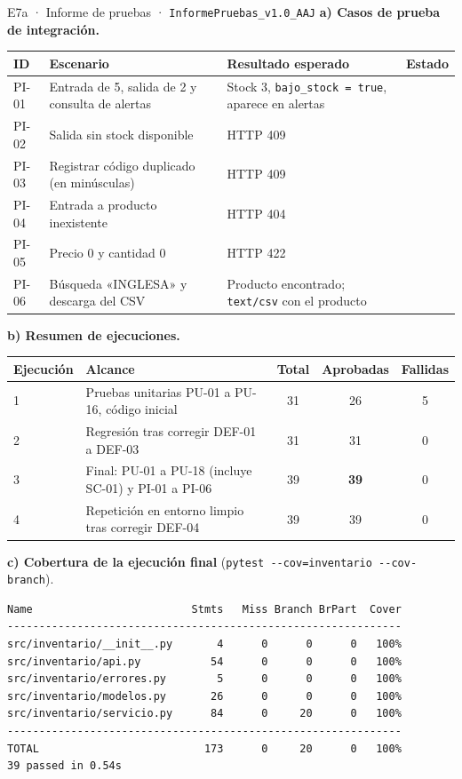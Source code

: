 \documentclass[11pt,a4paper]{article}
\newcommand{\si}{\textcolor{verdeespe}{\ding{51}}}
\newcommand{\cod}[1]{\texttt{\small #1}}
\begin{document}
\begin{evidencia}{E7a · Informe de pruebas · \cod{InformePruebas\_v1.0\_AAJ}}
\small
\textbf{a) Casos de prueba de integración.}

\begin{tabularx}{\linewidth}{@{}l L l c@{}}
\toprule
\textbf{ID} & \textbf{Escenario} & \textbf{Resultado esperado} & \textbf{Estado} \\
\midrule
PI-01 & Entrada de 5, salida de 2 y consulta de alertas & Stock 3, \cod{bajo\_stock = true}, aparece en alertas & \si \\
PI-02 & Salida sin stock disponible & HTTP 409 & \si \\
PI-03 & Registrar código duplicado (en minúsculas) & HTTP 409 & \si \\
PI-04 & Entrada a producto inexistente & HTTP 404 & \si \\
PI-05 & Precio 0 y cantidad 0 & HTTP 422 & \si \\
PI-06 & Búsqueda «INGLESA» y descarga del CSV & Producto encontrado; \cod{text/csv} con el producto & \si \\
\bottomrule
\end{tabularx}

\vspace{0.3cm}
\textbf{b) Resumen de ejecuciones.}

\begin{tabularx}{\linewidth}{@{}l L c c c@{}}
\toprule
\textbf{Ejecución} & \textbf{Alcance} & \textbf{Total} & \textbf{Aprobadas} & \textbf{Fallidas} \\
 & Pruebas unitarias PU-01 a PU-16, código inicial & 31 & 26 & 5 \\
2 & Regresión tras corregir DEF-01 a DEF-03 & 31 & 31 & 0 \\
3 & Final: PU-01 a PU-18 (incluye SC-01) y PI-01 a PI-06 & 39 & \textbf{39} & 0 \\
4 & Repetición en entorno limpio tras corregir DEF-04 & 39 & 39 & 0 \\
\bottomrule
\end{tabularx}

\vspace{0.3cm}
\textbf{c) Cobertura de la ejecución final} (\cod{pytest -{}-cov=inventario -{}-cov-branch}).
\begin{lstlisting}[style=consola]
Name                         Stmts   Miss Branch BrPart  Cover
--------------------------------------------------------------
src/inventario/__init__.py       4      0      0      0   100%
src/inventario/api.py           54      0      0      0   100%
src/inventario/errores.py        5      0      0      0   100%
src/inventario/modelos.py       26      0      0      0   100%
src/inventario/servicio.py      84      0     20      0   100%
--------------------------------------------------------------
TOTAL                          173      0     20      0   100%
39 passed in 0.54s
\end{lstlisting}


\end{evidencia}
\end{document}
